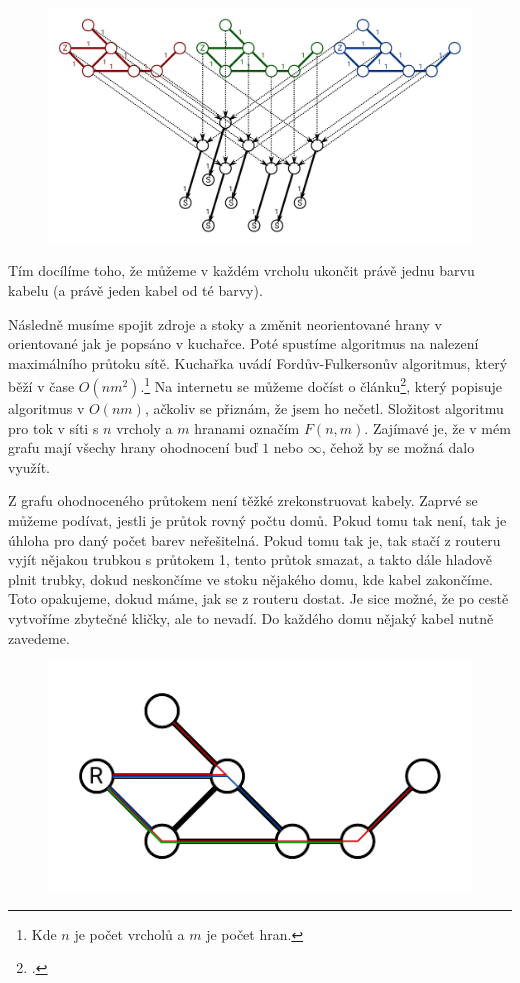 \documentclass{article}
\begin{document}
\begin{figure}[H]
    \centering
    \includegraphics[scale=0.7]{full.pdf}
\end{figure}

Tím docílíme toho, že můžeme v každém vrcholu ukončit právě jednu barvu kabelu (a právě jeden kabel od té barvy).

Následně musíme spojit zdroje a stoky a změnit neorientované hrany v orientované jak je popsáno v kuchařce. Poté spustíme algoritmus na nalezení maximálního průtoku sítě. Kuchařka uvádí Fordův-Fulkersonův algoritmus, který běží v čase \(O(nm^2)\).\footnote{Kde \(n\) je počet vrcholů a \(m\) je počet hran.} Na internetu se můžeme dočíst o článku\footcite{max-flow-onm}, který popisuje algoritmus v \(O(nm)\), ačkoliv se přiznám, že jsem ho nečetl. Složitost algoritmu pro tok v síti s \(n\) vrcholy a \(m\) hranami označím \(F(n, m)\). Zajímavé je, že v mém grafu mají všechy hrany ohodnocení buď \(1\) nebo \(\infty\), čehož by se možná dalo využít.

Z grafu ohodnoceného průtokem není těžké zrekonstruovat kabely. Zaprvé se můžeme podívat, jestli je průtok rovný počtu domů. Pokud tomu tak není, tak je úhloha pro daný počet barev neřešitelná. Pokud tomu tak je, tak stačí z routeru vyjít nějakou trubkou s průtokem 1, tento průtok smazat, a takto dále hladově plnit trubky, dokud neskončíme ve stoku nějakého domu, kde kabel zakončíme. Toto opakujeme, dokud máme, jak se z routeru dostat. Je sice možné, že po cestě vytvoříme zbytečné kličky, ale to nevadí. Do každého domu nějaký kabel nutně zavedeme.

\begin{figure}[H]
    \centering
    \includegraphics[scale=0.7]{wired.pdf}
\end{figure}
\end{document}

